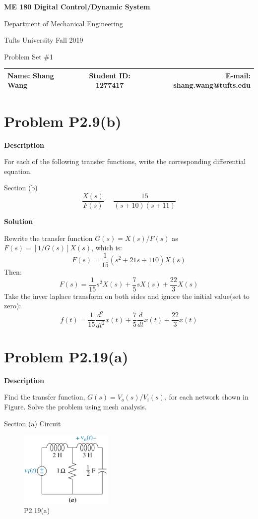 \documentclass[a4paper]{article}
\begin{document}
\begin{center}
\bf\Large
ME  180  Digital Control/Dynamic System\par
Department of Mechanical Engineering\par
Tufts University Fall 2019\par
Problem Set \#1\par
\end{center}
\begin{table}[H]
\begin{center}
\begin{tabular*}{\textwidth}{@{\extracolsep{\fill}}lcr}
Name: Shang Wang &Student ID: 1277417 &E-mail: shang.wang@tufts.edu\\
\hline
\end{tabular*}
\end{center}
\end{table}

\section{Problem P2.9(b)}
{\par\noindent \bf\large  Description   \par}
For each of the following transfer functions, write the
corresponding differential equation. 
\par Section (b) 
$$\frac{X(s)}{F(s)} = \frac{15}{(s+10)(s+11)}$$
{\par\noindent\bf\large Solution \par}
Rewrite the transfer function $G(s) = X(s)/F(s)$ as $F(s) = [1/G(s)] X(s)$, which is:
$$
F(s) = \frac{1}{15} (s^2 + 21s + 110) X(s) 
$$
Then:
$$
F(s) = \frac{1}{15} s^2X(s) + \frac{7}{5}sX(s) + \frac{22}{3}X(s)
$$
Take the inver laplace transform on both sides and ignore the initial value(set to zero):
$$
f(t) = \frac{1}{15} \frac{d^2}{dt^2}x(t) + \frac{7}{5}\frac{d}{dt}x(t) + \frac{22}{3}x(t)
$$

\section{Problem P2.19(a)}
{\par\noindent \bf\large  Description   \par}
Find the transfer function,	$G(s) = V_o(s)/V_i(s)$, for each network shown in Figure. Solve the problem using mesh analysis. 
\par Section (a) Circuit 
\begin{figure}[H]
\centering
\includegraphics[width=0.4\textwidth]{pic/ch2_19a.png}
\caption{P2.19(a)} 
\end{figure}
\end{document}
